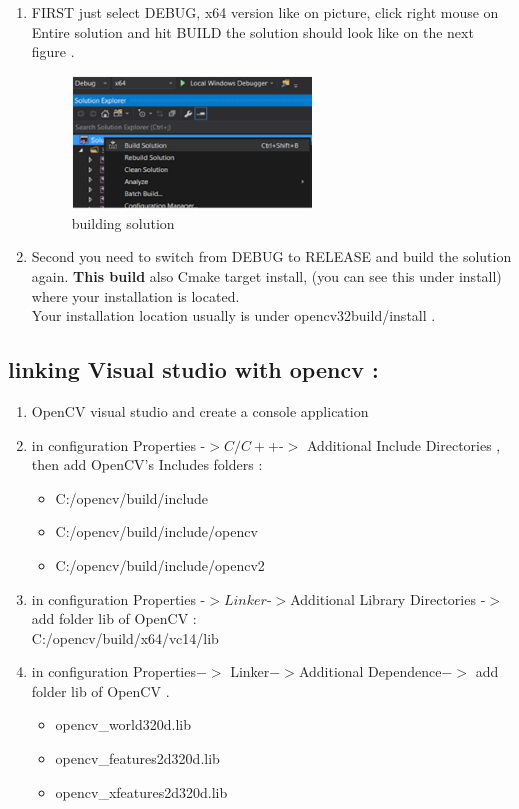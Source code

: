\begin{enumerate}
\item FIRST just select DEBUG, x64 version like on picture, click right mouse on Entire solution and hit BUILD the  solution should look like on the next figure . 
\begin{figure}[H]
\centering
\includegraphics[width=0.6\textwidth]{img/working3.png}
\caption{ building solution}
\label{fig:working3}
\end{figure}

\item 	Second you need to switch from DEBUG to RELEASE and build the solution again. \textbf{This build} also Cmake target install, (you can see this under install) where  your installation is located. \\
Your installation location usually is under opencv32build/install .

\end{enumerate}

\subsection{linking Visual studio with opencv :}

\begin{enumerate}
\item OpenCV visual studio and create a console application 
\item in configuration Properties -$> C/C++ $-$>$ Additional Include Directories , then add OpenCV's Includes folders :
 \begin{itemize}
     \item C:/opencv/build/include
     \item C:/opencv/build/include/opencv
     \item C:/opencv/build/include/opencv2
   \end{itemize}
\item in configuration Properties -$>Linker$-$>$Additional Library Directories -$> $ add folder lib of OpenCV :\\
     C:/opencv/build/x64/vc14/lib 
\item in configuration Properties$->$ Linker$->$Additional Dependence$->$ add folder lib of OpenCV .
 \begin{itemize}
     \item opencv\_world320d.lib
     \item opencv\_features2d320d.lib
     \item opencv\_xfeatures2d320d.lib
   \end{itemize}

\end{enumerate}

